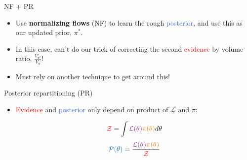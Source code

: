 \documentclass[aspectratio=169, 11pt]{beamer}
\begin{document}
\begin{frame}{NF + PR}
\begin{itemize}\vspace{1em}
    \item<1-> Use \textbf{normalizing flows} (NF) to learn the rough \textcolor{RoyalBlue}{posterior}, and use this as our updated prior, $\pi^\ast$.
    \item<1-> In this case, can't do our trick of correcting the second \textcolor{red}{evidence} by volume ratio, $\frac{V_{\pi^\ast}}{V_{\pi}}$!
    \item<1-> Must rely on another technique to get around this!
\end{itemize}\vspace{2em}
\hspace{2em}\vfill
\begin{minipage}{1\textwidth}
\end{minipage}
\end{frame}\begin{frame}{Posterior repartitioning (PR)}\vfill
\begin{itemize}
    \item \textcolor{red}{Evidence} and \textcolor{RoyalBlue}{posterior} only depend on product of $\mathcal{L}$ and $\pi$: \vspace{-2em}
\begin{multicols}{2}
\begin{equation}
    \textcolor{red}{\mathcal{Z}} = \int \textcolor{Purple}{\mathcal{L}(\theta)} \textcolor{BurntOrange}{\pi(\theta)} d\theta
\end{equation}\break
\begin{equation}
    \textcolor{RoyalBlue}{\mathcal{P}(\theta)} = \frac{\textcolor{Purple}{\mathcal{L}(\theta)} \textcolor{BurntOrange}{\pi(\theta)}}{\textcolor{red}{\mathcal{Z}}}
\end{equation}
\end{multicols}


\end{itemize}
\end{frame}
\end{document}
